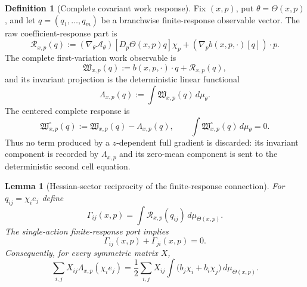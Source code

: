 \documentclass[12pt, letterpaper]{amsart}
\newcommand{\Acal}{\mathcal{A}}
\theoremstyle{plain}
\newtheorem{lemma}[theorem]{Lemma}
\theoremstyle{definition}
\newtheorem{definition}[theorem]{Definition}
\theoremstyle{remark}
\begin{document}
\begin{definition}[Complete covariant work response]
\label{def:complete_covariant_work_response}
Fix $(x,p)$, put $\theta=\Theta(x,p)$, and let $q=(q_1,\ldots,q_m)$ be a
branchwise finite-response observable vector.  The raw coefficient-response part
is
\begin{equation}
\label{eq:finite_response_connection_observable}
    \mathcal R_{x,p}(q)
    :=(\nabla_\theta\Acal_\theta)[D_p\Theta(x,p)q] \chi_p
      +(\nabla_p b(x,p,\cdot)[q])\cdot p .
\end{equation}
The complete first-variation work observable is
\begin{equation}
\label{eq:complete_work_response_observable}
    \mathfrak W_{x,p}(q)
       :=b(x,p,\cdot)\cdot q+\mathcal R_{x,p}(q),
\end{equation}
and its invariant projection is the deterministic linear functional
\begin{equation}
\label{eq:complete_work_response_projection}
    \Lambda_{x,p}(q)
       :=\int \mathfrak W_{x,p}(q)\,d\mu_\theta .
\end{equation}
The centered complete response is
\begin{equation}
\label{eq:finite_response_connection_centered}
    \mathfrak W^{\circ}_{x,p}(q)
       :=\mathfrak W_{x,p}(q)-\Lambda_{x,p}(q),
    \qquad
    \int \mathfrak W^{\circ}_{x,p}(q)\,d\mu_\theta=0 .
\end{equation}
Thus no term produced by a $z$-dependent full gradient is discarded: its
invariant component is recorded by $\Lambda_{x,p}$ and its zero-mean component is
sent to the deterministic second cell equation.
\end{definition}

\begin{lemma}[Hessian-sector reciprocity of the finite-response connection]
\label{lem:hessian_sector_reciprocity}
For $q_{ij}=\chi_i e_j$ define
\begin{equation}
    \Gamma_{ij}(x,p)
    =\int \mathcal R_{x,p}(q_{ij})\,d\mu_{\Theta(x,p)} .
\end{equation}
The single-action finite-response port implies
\begin{equation}
\label{eq:connection_skewness_hessian_sector}
    \Gamma_{ij}(x,p)+\Gamma_{ji}(x,p)=0 .
\end{equation}
Consequently, for every symmetric matrix $X$,
\begin{equation}
\label{eq:hessian_projection_GK_equivalence}
    \sum_{i,j}X_{ij}\Lambda_{x,p}(\chi_i e_j)
    =\frac12\sum_{i,j}X_{ij}\int
       \bigl(b_j\chi_i+b_i\chi_j\bigr)\,d\mu_{\Theta(x,p)} .
\end{equation}
\end{lemma}
\end{document}
